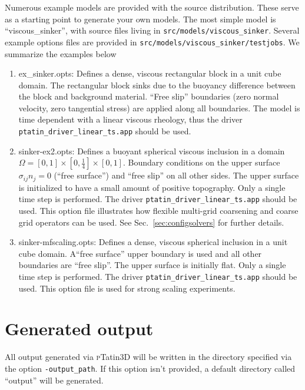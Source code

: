 \documentclass[paper=a4, fontsize=11pt,twoside]{scrartcl}
\newcommand{\ptat}{{{\textsc pTatin3D}}}
\newcommand{\unix}[1]{\texttt{\footnotesize #1}}
\begin{document}
{{Numerous example models are provided with the source distribution. These serve as a starting point to generate your own models. The most simple model is ``viscous\_sinker'', with source files living in \unix{src/models/viscous\_sinker}. Several example options files are provided in \unix{src/models/viscous\_sinker/testjobs}. We summarize the examples below
\begin{enumerate}
	\item ex\_sinker.opts: Defines a dense, viscous rectangular block in a unit cube domain. The rectangular block sinks due to the buoyancy difference between the block and background material. ``Free slip'' boundaries (zero normal velocity, zero tangential stress) are applied along all boundaries. The model is time dependent with a linear viscous rheology, thus the driver \unix{ptatin\_driver\_linear\_ts.app} should be used.

	\item sinker-ex2.opts: Defines a buoyant spherical viscous inclusion in a domain $\Omega = [0,1] \times [0,\tfrac{1}{4}] \times [0,1]$. Boundary conditions on the upper surface $\sigma_{ij}n_j=0$ (``free surface'') and ``free slip'' on all other sides. The upper surface is initialized to have a small amount of positive topography. Only a single time step is performed. The driver \unix{ptatin\_driver\_linear\_ts.app} should be used. This option file illustrates how flexible multi-grid coarsening and coarse grid operators can be used. See Sec.~\ref{sec:configsolvers} for further details.

	\item sinker-mfscaling.opts: Defines a dense, viscous spherical inclusion in a unit cube domain. A``free surface'' upper boundary is used and all other boundaries are ``free slip''. The upper surface is initially flat. Only a single time step is performed. The driver \unix{ptatin\_driver\_linear\_ts.app} should be used. This option file is used for strong scaling experiments.
\end{enumerate}

\newpage
\section{Generated output}
All output generated via {\ptat} will be written in the directory specified via the option \unix{-output\_path}. If this option isn't provided, a default directory called ``output'' will be generated.

}}
\end{document}
